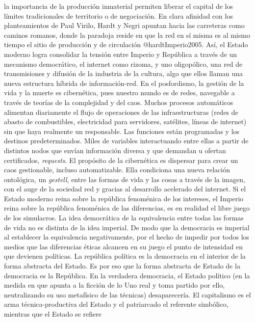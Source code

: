 \documentclass[
]{article}
\begin{document}
la importancia de la producción inmaterial permiten liberar el capital
de los límites tradicionales de territorio o de negociación. En clara
afinidad con los planteamientos de Paul Virilo, Hardt y Negri apuntan
hacia las carreteras como caminos romanos, donde la paradoja reside en
que la red en sí misma es al mismo tiempo el sitio de producción y de
circulación @hardtImperio2005. Así, el Estado moderno logra consolidar
la tensión entre Imperio y República a través de un mecanismo
democrático, el internet como rizoma, y uno oligopólico, una red de
transmisiones y difusión de la industria de la cultura, algo que ellos
llaman una nueva estructura híbrida de información-red. En el
posfordismo, la gestión de la vida y la muerte es cibernética, pues
nuestro mundo es de redes, navegable a través de teorías de la
complejidad y del caos. Muchos procesos automáticos alimentan
diariamente el flujo de operaciones de las infraestructuras (redes de
abasto de combustibles, electricidad para servidores, satélites, líneas
de internet) sin que haya realmente un responsable. Las funciones están
programadas y los destinos predeterminados. Miles de variables
interactuando entre ellas a partir de distintos nodos que envían
información diversa y que demandan u ofertan certificados,
\emph{requests}. El propósito de la cibernética es dispersar para crear
un caos gestionable, incluso automatizable. Ella condiciona una nueva
relación ontológica, un \emph{gestell}, entre las formas de vida y las
cosas a través de la imagen, con el auge de la sociedad red y gracias al
desarrollo acelerado del internet. Si el Estado moderno reina sobre la
república fenoménica de los intereses, el Imperio reina sobre la
república fenoménica de las diferencias, es en realidad el libre juego
de los simulacros. La idea democrática de la equivalencia entre todas
las formas de vida no es distinta de la idea imperial. De modo que la
democracia es imperial al establecer la equivalencia negativamente, por
el hecho de impedir por todos los medios que las diferencias éticas
alcancen en su juego el punto de intensidad en que devienen políticas.
La república política es la democracia en el interior de la forma
abstracta del Estado. Es por eso que la forma abstracta de Estado de la
democracia es la República. En la verdadera democracia, el Estado
político (en la medida en que apunta a la ficción de lo Uno real y toma
partido por ello, neutralizando su uso metafísico de las técnicas)
desaparecería. El capitalismo es el arma técnica-productiva del Estado y
el patriarcado el referente simbólico, mientras que el Estado se refiere
\end{document}
